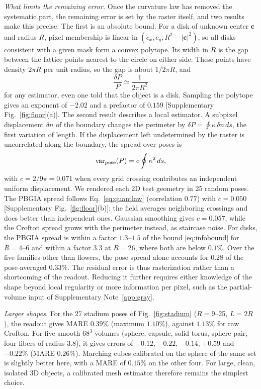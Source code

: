 \documentclass[11pt,a4paper]{article}
\begin{document}
\emph{What limits the remaining error.} Once the curvature law has removed the systematic part, the remaining error is set by the raster itself, and two results make this precise. The first is an absolute bound. For a disk of unknown center $\bm c$ and radius $R$, pixel membership is linear in $(c_x,c_y,R^2-|\bm c|^2)$, so all disks consistent with a given mask form a convex polytope. Its width in $R$ is the gap between the lattice points nearest to the circle on either side. These points have density $2\pi R$ per unit radius, so the gap is about $1/2\pi R$, and
\begin{equation}
\frac{\delta P}{P}\simeq\frac{1}{2\pi R^{2}}
\label{eq:infobound}
\end{equation}
for any estimator, even one told that the object is a disk. Sampling the polytope gives an exponent of $-2.02$ and a prefactor of $0.159$ [Supplementary Fig.~\ref{fig:floor}(a)]. The second result describes a local estimator. A subpixel displacement $\delta n$ of the boundary changes the perimeter by $\delta P=\oint\kappa\,\delta n\,ds$, the first variation of length. If the displacement left undetermined by the raster is uncorrelated along the boundary, the spread over poses is
\begin{equation}
\mathrm{var}_{\rm pose}(P)=c\oint\kappa^{2}\,ds,
\label{eq:quantlaw}
\end{equation}
with $c=2/9\pi=0.071$ when every grid crossing contributes an independent uniform displacement. We rendered each 2D test geometry in 25 random poses. The PBGIA spread follows Eq.~\eqref{eq:quantlaw} (correlation $0.77$) with $c=0.050$ [Supplementary Fig.~\ref{fig:floor}(b)]: the field averages neighboring crossings and does better than independent ones. Gaussian smoothing gives $c=0.057$, while the Crofton spread grows with the perimeter instead, as staircase noise. For disks, the PBGIA spread is within a factor $1.3$--$1.5$ of the bound \eqref{eq:infobound} for $R=4$--$6$ and within a factor $3.3$ at $R=26$, where both are below $0.1\%$. Over the five families other than flowers, the pose spread alone accounts for $0.28$ of the pose-averaged $0.33\%$. The residual error is thus rasterization rather than a shortcoming of the readout. Reducing it further requires either knowledge of the shape beyond local regularity or more information per pixel, such as the partial-volume input of Supplementary Note~\ref{app:gray}.





\emph{Larger shapes.} For the 27 stadium poses of Fig.~\ref{fig:stadium} ($R=9$--25, $L=2R$), the readout gives MARE $0.39\%$ (maximum $1.10\%$), against $1.13\%$ for raw Crofton. For five smooth $68^3$ volumes (sphere, capsule, solid torus, sphere pair, four fibers of radius $3.8$), it gives errors of $-0.12$, $-0.22$, $-0.14$, $+0.59$ and $-0.22\%$ (MARE $0.26\%$). Marching cubes calibrated on the sphere of the same set is slightly better here, with a MARE of $0.15\%$ on the other four. For large, clean, isolated 3D objects, a calibrated mesh estimator therefore remains the simplest choice.
\end{document}
